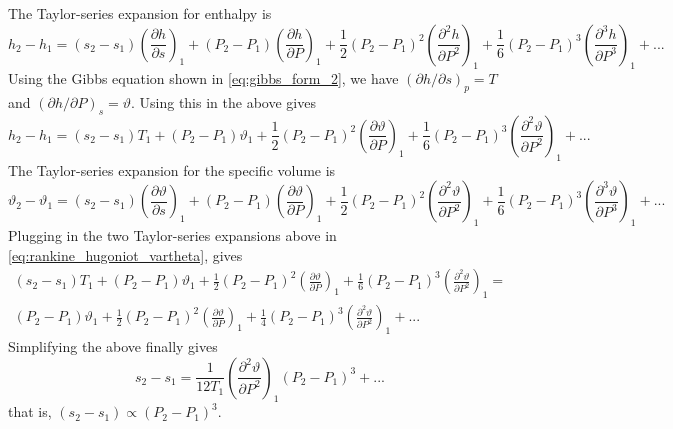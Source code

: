 \documentclass[oneside,a4paper,11pt]{report}
\begin{document}
The Taylor-series expansion for enthalpy is
\begin{equation}
    h_2 - h_1 = (s_2 - s_1) \left ( \frac{\partial h}{\partial s} \right)_1 + (P_2 - P_1) \left ( \frac{\partial h}{\partial P} \right)_1 + \frac{1}{2} (P_2 - P_1)^2 \left( \frac{\partial^2 h}{\partial P^2} \right)_1 + \frac{1}{6}  (P_2 - P_1)^3 \left ( \frac{\partial^3 h}{\partial P^3} \right)_1 + ...
\end{equation}
Using the Gibbs equation shown in \cref{eq:gibbs_form_2}, we have $(\partial h / \partial s)_p = T$ and $(\partial h/ \partial P)_s = \vartheta$. Using this in the above gives
\begin{equation}
    h_2 - h_1 = (s_2 - s_1) T_1 + (P_2 - P_1) \vartheta_1 + \frac{1}{2} (P_2 - P_1)^2 \left( \frac{\partial \vartheta}{\partial P} \right)_1 + \frac{1}{6}  (P_2 - P_1)^3 \left ( \frac{\partial^2 \vartheta}{\partial P^2} \right)_1 + ...
\end{equation}
The Taylor-series expansion for the specific volume is
\begin{equation}
    \vartheta_2 - \vartheta_1 = (s_2 - s_1) \left ( \frac{\partial \vartheta}{\partial s} \right)_1 + (P_2 - P_1) \left ( \frac{\partial \vartheta}{\partial P} \right)_1 + \frac{1}{2} (P_2 - P_1)^2 \left( \frac{\partial^2 \vartheta}{\partial P^2} \right)_1 + \frac{1}{6}  (P_2 - P_1)^3 \left ( \frac{\partial^3 \vartheta}{\partial P^3} \right)_1 + ...    
\end{equation}
Plugging in the two Taylor-series expansions above in \cref{eq:rankine_hugoniot_vartheta}, gives
\begin{multline}
(s_2 - s_1) T_1 + (P_2 - P_1) \vartheta_1 + \frac{1}{2} (P_2 - P_1)^2 \left( \frac{\partial \vartheta}{\partial P} \right)_1 + \frac{1}{6}  (P_2 - P_1)^3 \left ( \frac{\partial^2 \vartheta}{\partial P^2} \right)_1 =\\
(P_2 - P_1) \vartheta_1 + \frac{1}{2} (P_2 - P_1)^2 \left ( \frac{\partial \vartheta}{\partial P} \right)_1 + \frac{1}{4} (P_2 - P_1)^3 \left ( \frac{\partial^2 \vartheta}{\partial P^2} \right)_1 + ...
\end{multline}
Simplifying the above finally gives
\begin{equation}
    s_2 - s_1 = \frac{1}{12 T_1} \left ( \frac{\partial^2 \vartheta}{\partial P^2} \right)_1 (P_2 - P_1)^3 + ...
\end{equation}
that is, $(s_2 - s_1) \propto (P_2-P_1)^3$.

\end{document}
